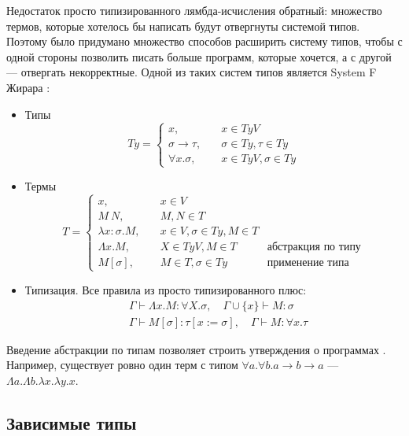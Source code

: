 Недостаток просто типизированного лямбда-исчисления обратный: множество термов,
которые хотелось бы написать будут отвергнуты системой типов. Поэтому было придумано
множество способов расширить систему типов, чтобы с одной стороны позволить писать
больше программ, которые хочется, а с другой --- отвергать некорректные. Одной из
таких систем типов является System F Жирара \cite{tapl}:
\begin{itemize}
\item Типы
   \[
   Ty = \left\{
   \begin{array}{lr}
   x,\quad& x \in TyV\\
   \sigma \rightarrow \tau,\quad& \sigma \in Ty, \tau \in Ty\\
   \forall x. \sigma,\quad& x \in TyV, \sigma \in Ty
   \end{array}
   \right.
   \]
\item Термы
   \[
   T = \left\{
   \begin{array}{lrr}
   x,\quad& x \in V&\\
   M\ N,\quad& M, N \in T&\\
   \lambda x : \sigma. M,\quad& x \in V, \sigma \in Ty, M \in T&\\
   \Lambda x. M,\quad& X \in TyV, M \in T\quad&\text{абстракция по типу}\\
   M [\sigma],\quad& M \in T, \sigma \in Ty\quad&\text{применение типа}
   \end{array}
   \right.
   \]
\item Типизация. Все правила из просто типизированного плюс:
   \begin{align*}
   & \Gamma \vdash \Lambda x. M: \forall X. \sigma,\quad \Gamma \cup \{x\} \vdash M : \sigma\\
   & \Gamma \vdash M [\sigma] : \tau[x := \sigma],\quad \Gamma \vdash M : \forall x. \tau
   \end{align*}
\end{itemize}

Введение абстракции по типам позволяет строить утверждения о программах \cite{theorems-for-free}.
Например, существует ровно один терм с типом \(\forall a. \forall b. a \rightarrow b \rightarrow a\) ---
\(\Lambda a. \Lambda b. \lambda x. \lambda y. x\).

\subsection{Зависимые типы}
